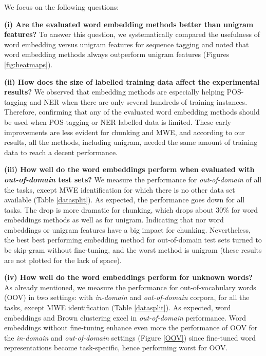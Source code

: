 We focus on the following questions:

\textbf{(i) Are the evaluated word embedding methods better than unigram features?}
To answer this question, we systematically compared the usefulness of word embedding versus
unigram features for sequence tagging and noted that word embedding methods always outperform 
unigram features (Figures \ref{fig:heatmaps}). 

\textbf{(ii) How does the size of labelled training data affect the experimental results?}
We observed that embedding methods are especially helping POS-tagging and NER when there are only several hundreds of training instances. 
Therefore, confirming that any of the evaluated word embedding methods should be used when POS-tagging or NER labelled data is limited.
These early improvements are less evident for chunking and MWE, and according to our results, all the methods, including unigram, needed the same amount of training data to reach a decent performance.

\textbf{(iii) How well do the word embeddings perform when evaluated with \textit{out-of-domain} test sets?}
We measure the performance for \textit{out-of-domain} of all the tasks, except MWE identification for which there is no other data set available (Table \ref{datasplit}).
As expected, the performance goes down for all tasks. The drop is more dramatic for chunking, which drops about 30\% for word embeddings methods as well as for unigram. 
Indicating that nor word embeddings or unigram features have a big impact for chunking.
Nevertheless, the best best performing embedding method for out-of-domain test sets turned to be skip-gram without fine-tuning, and the worst method is unigram (these results are not plotted for the lack of space).

\textbf{(iv) How well do the word embeddings perform for unknown words?}
As already mentioned, we measure the performance for out-of-vocabulary words (OOV)
in two settings: with \textit{in-domain} and \textit{out-of-domain} corpora, for all the tasks, except MWE identification (Table \ref{datasplit}).
As expected, word embeddings and Brown clustering excel in \textit{out-of-domain} performance.
Word embeddings without fine-tuning enhance even more the performance of OOV 
for the \textit{in-domain} and \textit{out-of-domain} settings (Figure \ref{OOV}) since fine-tuned
word representations become task-specific, hence performing worst for OOV.

